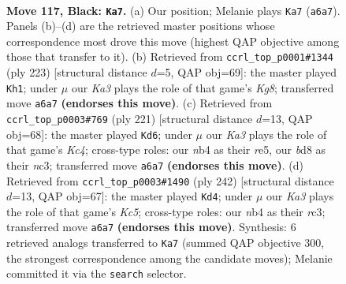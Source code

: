 \documentclass[11pt]{article}
\begin{document}
\clearpage

\begin{figure}[p]\centering
\begin{subfigure}{0.46\textwidth}\centering
\resizebox{\linewidth}{!}{%
\newchessgame
\chessboard[
  setfen={3B4/8/k7/5q2/1NK5/8/8/8 b - - 3 117},
  showmover=false,
  pgfstyle=straightmove, color=movearrow, markmove={a6-a7}
]}
\caption{}
\end{subfigure}\hfill
\begin{subfigure}{0.46\textwidth}\centering
\resizebox{\linewidth}{!}{%
\newchessgame
\chessboard[
  setfen={8/8/8/8/8/6KN/4B3/6k1 b - - 51 112},
  showmover=false,
  pgfstyle=straightmove, color=movearrow, markmove={g1-h1}
]}
\caption{}
\end{subfigure}
\\[4pt]
\begin{subfigure}{0.46\textwidth}\centering
\resizebox{\linewidth}{!}{%
\newchessgame
\chessboard[
  setfen={8/8/8/2k1R3/8/2NB4/2K5/7q b - - 22 111},
  showmover=false,
  pgfstyle=straightmove, color=movearrow, markmove={c5-d6}
]}
\caption{}
\end{subfigure}\hfill
\begin{subfigure}{0.46\textwidth}\centering
\resizebox{\linewidth}{!}{%
\newchessgame
\chessboard[
  setfen={8/8/8/2K5/k7/2r5/4Q3/8 w - - 19 122},
  showmover=false,
  pgfstyle=straightmove, color=movearrow, markmove={c5-d4}
]}
\caption{}
\end{subfigure}
\caption{\textbf{Move 117, Black: \texttt{Ka7}.} (a) Our position; Melanie plays \texttt{Ka7} (\texttt{a6a7}). Panels (b)--(d) are the retrieved master positions whose correspondence most drove this move (highest QAP objective among those that transfer to it). (b) Retrieved from \texttt{ccrl\_top\_p0001\#1344} (ply 223) [structural distance $d$=5, QAP obj=69]: the master played \texttt{Kh1}; under $\mu$ our \emph{Ka3} plays the role of that game's \emph{Kg8}; transferred move \texttt{a6a7} \textbf{(endorses this move)}. (c) Retrieved from \texttt{ccrl\_top\_p0003\#769} (ply 221) [structural distance $d$=13, QAP obj=68]: the master played \texttt{Kd6}; under $\mu$ our \emph{Ka3} plays the role of that game's \emph{Kc4}; cross-type roles: our \emph{n}b4 as their \emph{r}e5, our \emph{b}d8 as their \emph{n}c3; transferred move \texttt{a6a7} \textbf{(endorses this move)}. (d) Retrieved from \texttt{ccrl\_top\_p0003\#1490} (ply 242) [structural distance $d$=13, QAP obj=67]: the master played \texttt{Kd4}; under $\mu$ our \emph{Ka3} plays the role of that game's \emph{Kc5}; cross-type roles: our \emph{n}b4 as their \emph{r}c3; transferred move \texttt{a6a7} \textbf{(endorses this move)}. Synthesis: 6 retrieved analogs transferred to \texttt{Ka7} (summed QAP objective 300, the strongest correspondence among the candidate moves); Melanie committed it via the \texttt{search} selector.}
\label{fig:thought-m233}
\end{figure}
\end{document}
